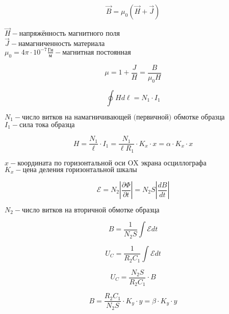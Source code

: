 \[
    \vec{B} = \mu_0(\vec{H} + \vec{J})
\]

\begin{center}
    $\vec{H} - \text{напряжённость магнитного поля}$ \\
    $\vec{J} - \text{намагниченность материала}$ \\
    $\mu_0 = 4\pi \cdot 10^{-7} \frac{\text{Гн}}{\text{м}} - \text{магнитная постоянная}$
\end{center}

\[
    \mu = 1 + \frac{J}{H} = \frac{B}{\mu_0 H}
\]

\[
    \oint H d\ell = N_1 \cdot I_1
\]

\begin{center}
    $N_1 - \text{число витков на намагничивающей (первичной) обмотке образца}$ \\
    $I_1 - \text{сила тока образца}$
\end{center}

\[
    H = \frac{N_1}{\ell} \cdot I_1 = \frac{N_1}{\ell R_1} \cdot K_x \cdot x = \alpha \cdot K_x \cdot x
\]

\begin{center}
    $x - \text{координата по горизонтальной оси OX экрана осциллографа}$ \\
    $K_x - \text{цена деления горизонтальной шкалы}$
\end{center}

\[
    \mathscr{E} = N_2 \left| \frac{\partial \Phi}{\partial t} \right| = N_2 S \left| \frac{dB}{dt} \right|
\]

\begin{center}
    $N_2 - \text{число витков на вторичной обмотке образца}$
\end{center}

\[
    B = \frac{1}{N_2 S} \int{\mathscr{E}}dt
\]

\[
    U_C = \frac{1}{R_2 C_1} \int{\mathscr{E}}dt
\]

\[
    U_C = \frac{N_2 S}{R_2 C_1} \cdot B
\]

\[
    B = \frac{R_2 C_1}{N_2 S}\cdot K_y \cdot y = \beta \cdot K_y \cdot y  
\]

